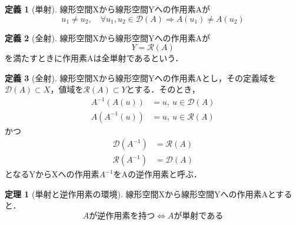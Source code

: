 \documentclass[11pt,a4paper]{jsarticle}
\theoremstyle{definition}
\newtheorem{dfn}{定義}
\newtheorem{thm}{定理}
\begin{document}
\begin{dfn}[単射]
  \label{injection}
  線形空間Xから線形空間Yへの作用素Aが
  \begin{equation*}
    u_1 \neq u_2, \quad \forall u_1,u_2 \in \mathcal{D}(A) \Rightarrow A(u_1)\neq A(u_2)
  \end{equation*}
\end{dfn}

\begin{dfn}[全射]
  線形空間Xから線形空間Yへの作用素Aが
  \begin{equation*}
    Y=\mathcal{R}(A)
  \end{equation*}
  を満たすときに作用素Aは全単射であるという．
\end{dfn}

\begin{dfn}[全射]
  線形空間Xから線形空間Yへの作用素Aとし，その定義域を$\mathcal{D}(A)\subset X$，値域を$\mathcal{R}(A)\subset Y$とする．そのとき，
  \begin{align*}
    A^{-1}\left( A\left( u \right) \right) & =u, \  u\in\mathcal{D}\left( A \right) \\
    A(A^{-1}(u))                           & =u, \  u\in\mathcal{R}(A)
  \end{align*}
  かつ
  \begin{align*}
    \mathcal{D}(A^{-1}) & =\mathcal{R}(A) \\
    \mathcal{R}(A^{-1}) & =\mathcal{D}(A)
  \end{align*}
  となるYからXへの作用素$A^{-1}$をAの逆作用素と呼ぶ．
\end{dfn}

\begin{thm}[単射と逆作用素の環境]
  線形空間Xから線形空間Yへの作用素Aとすると．
  \begin{equation*}
    Aが逆作用素を持つ \Leftrightarrow Aが単射である
  \end{equation*}
\end{thm}
\end{document}
